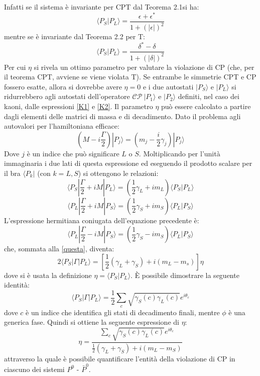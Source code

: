Infatti se il sistema \`e invariante per CPT dal Teorema 2.1si ha:
\begin{equation} 
\langle P_S|P_L\rangle = \frac{\epsilon + \epsilon^*}{1 + (|\epsilon|)^2}
\end{equation}
mentre se \`e invariante dal Teorema 2.2 per T:
\begin{equation}
 \langle P_S|P_L\rangle = \frac{\delta^* - \delta}{1 + (|\delta|)^2}
\end{equation}
Per cui $\eta$ si rivela un ottimo parametro per valutare la violazione di CP (che, per il teorema CPT, avviene se viene violata T).
Se entrambe le simmetrie CPT e CP fossero esatte, allora si dovrebbe avere $\eta = 0$ e i due autostati $|P_S\rangle$ e $|P_L\rangle$
si ridurrebbero agli autostati dell'operatore $\mathscr{C}\mathscr{P}\ |P_1\rangle$ e $|P_2\rangle$ definiti, nel caso dei kaoni, dalle espressioni \eqref{K1} e \eqref{K2}.
Il parametro $\eta$ può essere calcolato a partire dagli elementi delle matrici di massa e di decadimento. Dato il problema agli autovalori per l'hamiltoniana efficace:
\begin{equation}
(M - i \frac{\Gamma}{2})|P_j\rangle = (m_j - \frac{i}{2} \gamma_j) |P_j\rangle
\end{equation}
Dove $j$ è un indice che può significare $L$ o $S$.
Moltiplicando per l'unità immaginaria i due lati di questa espressione ed eseguendo il prodotto scalare per il bra $\langle P_k|$ (con $k = L, S$) si ottengono le relazioni:
\begin{equation}
 \langle P_S | \frac{\Gamma}{2} + iM | P_L \rangle = (\frac{1}{2} \gamma_L + i m_L) \langle P_S |P_L\rangle 
\end{equation}
\begin{equation} \label{questa}
 \langle P_L | \frac{\Gamma}{2} + iM | P_S \rangle = (\frac{1}{2} \gamma_S + i m_S) \langle P_L |P_S\rangle 
\end{equation}
L'espressione hermitiana coniugata dell'equazione precedente è:
\begin{equation}
 \langle P_L | \frac{\Gamma}{2} - iM | P_S \rangle = (\frac{1}{2} \gamma_S - i m_S) \langle P_L |P_S\rangle 
\end{equation}
che, sommata alla \eqref{questa}, diventa:
\begin{equation}
 2\langle P_S |\Gamma | P_L \rangle = [\frac{1}{2} (\gamma_L + \gamma_S) + i(m_L - m_s)] \eta
\end{equation}
 dove si è usata la definizione $\eta = \langle P_S|P_L \rangle$.
È possibile dimostrare \cite{Lee} la seguente identità:
\begin{equation}
 \langle P_S |\Gamma |P_L \rangle = \frac{1}{2} \sum_c \sqrt{\gamma_S(c)\gamma_L(c)} e^{i\theta_c}
\end{equation}
dove $c$ è un indice che identifica gli stati di decadimento finali, mentre $\phi$ è una generica fase.
Quindi si ottiene la seguente espressione di $\eta$:
\begin{equation}
 \eta = \frac{\sum_c \sqrt{\gamma_S(c)\gamma_L(c)} e^{i\theta_c}}{\frac{1}{2} (\gamma_L + \gamma_S) + i (m_L - m_S)}
\end{equation}
attraverso la quale è possibile quantificare l'entità della violazione di CP in ciascuno dei sistemi $P^0$ - $\bar{P}^0$.